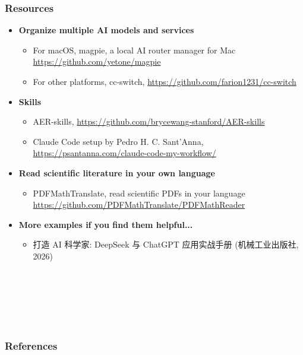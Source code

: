 \documentclass[aspectratio=169]{beamer}
\newcommand{\referencesize}{\tiny}
\begin{document}
\begin{frame}
  \frametitle{Resources}
  \begin{itemize}
      \item \textbf{Organize multiple AI models and services}
        \begin{itemize}
          \item For macOS, magpie, a local AI router manager for Mac \url{https://github.com/yetone/magpie} 
          \item For other platforms, cc-switch, \url{https://github.com/farion1231/cc-switch}
        \end{itemize}
      \item \textbf{Skills}
              \begin{itemize}
                \item AER-skills, \url{https://github.com/brycewang-stanford/AER-skills}
                \item Claude Code setup by Pedro H. C. Sant'Anna, \url{https://psantanna.com/claude-code-my-workflow/}
              \end{itemize}
      \item \textbf{Read scientific literature in your own language}
        \begin{itemize}
          \item PDFMathTranslate, read scientific PDFs in your language \url{https://github.com/PDFMathTranslate/PDFMathReader} \parencite{ouyang-etal-2025-pdfmathtranslate}
        \end{itemize}
        \item \textbf{More examples if you find them helpful...}
        \begin{itemize}
          \item 打造 AI 科学家: DeepSeek 与 ChatGPT 应用实战手册 (机械工业出版社, 2026)
        \end{itemize}
  \end{itemize}
\end{frame}



{
  \begin{frame}
    \begin{center}
      \Huge{\textcolor{white}{Acknowledgments}}
    \end{center}
    \vspace{1cm}
    \normalsize{\textcolor{white}{Thanks to Hongzhan Lin, Yanlin Li, Hao Li, Ziqi Lu, Long Wang, Bei Zhan, Jianjun Yu, and Qinghua Qin for exchanging early ideas on this topic with me. All errors are my own.}}
  \end{frame}
}


\begin{frame}[allowframebreaks]
  \frametitle{References}
  \begingroup
  \referencesize\color{black}
  \printbibliography[notkeyword=chinese,heading=none]
  \endgroup
\end{frame}
\end{document}
